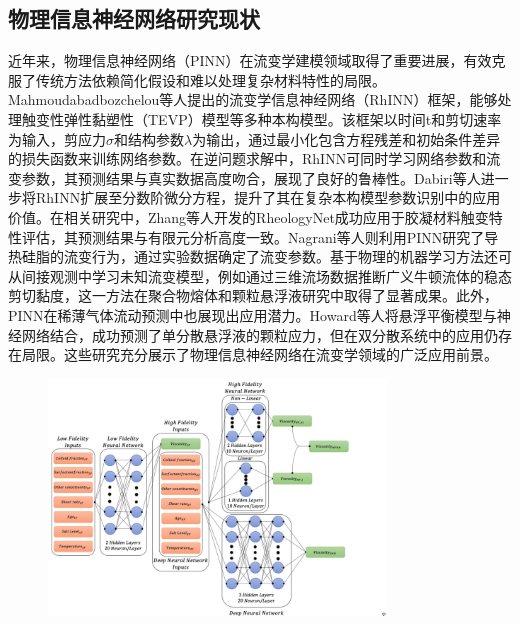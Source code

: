 \subsection{物理信息神经网络研究现状}
近年来，物理信息神经网络（PINN）在流变学建模领域取得了重要进展，有效克服了传统方法依赖简化假设和难以处理复杂材料特性的局限。Mahmoudabadbozchelou等人提出的流变学信息神经网络（RhINN）框架，能够处理触变性弹性黏塑性（TEVP）模型等多种本构模型\cite{mahmoudabadbozchelouRheologyInformedNeuralNetworks2021}。该框架以时间t和剪切速率为输入，剪应力$\sigma$和结构参数$\lambda$为输出，通过最小化包含方程残差和初始条件差异的损失函数来训练网络参数。在逆问题求解中，RhINN可同时学习网络参数和流变参数，其预测结果与真实数据高度吻合，展现了良好的鲁棒性。Dabiri等人进一步将RhINN扩展至分数阶微分方程，提升了其在复杂本构模型参数识别中的应用价值\cite{dabiri2023}。在相关研究中，Zhang等人开发的RheologyNet成功应用于胶凝材料触变特性评估，其预测结果与有限元分析高度一致\cite{zhangRheologyNetPhysicsinformedNeural2023}。Nagrani等人则利用PINN研究了导热硅脂的流变行为，通过实验数据确定了流变参数\cite{nagrani2023}。基于物理的机器学习方法还可从间接观测中学习未知流变模型，例如通过三维流场数据推断广义牛顿流体的稳态剪切黏度，这一方法在聚合物熔体和颗粒悬浮液研究中取得了显著成果。此外，PINN在稀薄气体流动预测中也展现出应用潜力\cite{tucnyLearningViscosityFunctions2024}。Howard等人将悬浮平衡模型与神经网络结合，成功预测了单分散悬浮液的颗粒应力，但在双分散系统中的应用仍存在局限。这些研究充分展示了物理信息神经网络在流变学领域的广泛应用前景\cite{howardMachineLearningMethods2023}。
\begin{figure}[htbp]
  \centering
  \includegraphics[width=0.8\textwidth]{Fig/MFNN.png}
\end{figure}

